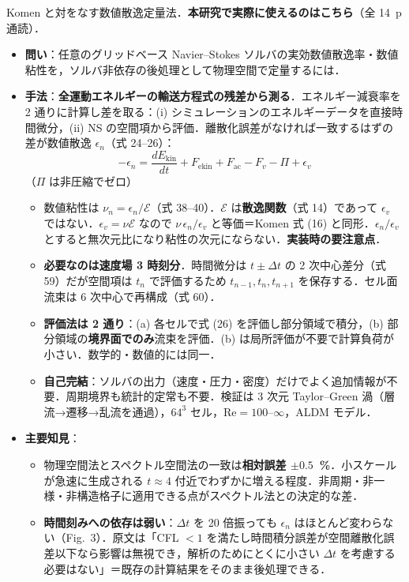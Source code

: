 \documentclass[11pt]{jsarticle}
\newcommand{\litref}[1]{{\large\bfseries\color{citecolor}#1}}
\begin{document}
\noindent\litref{Schranner et al. (2015)}\quad Komen と対をなす数値散逸定量法．\textbf{本研究で実際に使えるのはこちら}（全 14~p 通読）．
\begin{itemize}
  \item \textbf{問い}：任意のグリッドベース Navier--Stokes ソルバの実効数値散逸率・数値粘性を，ソルバ非依存の後処理として物理空間で定量するには．
  \item \textbf{手法}：\textbf{全運動エネルギーの輸送方程式の残差から測る}．エネルギー減衰率を 2 通りに計算し差を取る：(i) シミュレーションのエネルギーデータを直接時間微分，(ii) NS の空間項から評価．離散化誤差がなければ一致するはずの差が数値散逸 $\epsilon_n$（式 24--26）：
  \[ -\epsilon_n = \frac{dE_\mathrm{kin}}{dt} + F_\mathrm{ekin} + F_\mathrm{ac} - F_v - \Pi + \epsilon_v \]
  （$\Pi$ は非圧縮でゼロ）
  \begin{itemize}
    \item 数値粘性は $\nu_n = \epsilon_n/\mathcal{E}$（式 38--40）．$\mathcal{E}$ は\textbf{散逸関数}（式 14）であって $\epsilon_v$ ではない．$\epsilon_v = \nu\mathcal{E}$ なので $\nu\,\epsilon_n/\epsilon_v$ と等価＝Komen 式 (16) と同形．$\epsilon_n/\epsilon_v$ とすると無次元比になり粘性の次元にならない．\textbf{実装時の要注意点}．
    \item \textbf{必要なのは速度場 3 時刻分}．時間微分は $t \pm \Delta t$ の 2 次中心差分（式 59）だが空間項は $t_n$ で評価するため $t_{n-1}, t_n, t_{n+1}$ を保存する．セル面流束は 6 次中心で再構成（式 60）．
    \item \textbf{評価法は 2 通り}：(a) 各セルで式 (26) を評価し部分領域で積分，(b) 部分領域の\textbf{境界面でのみ}流束を評価．(b) は局所評価が不要で計算負荷が小さい．数学的・数値的には同一．
    \item \textbf{自己完結}：ソルバの出力（速度・圧力・密度）だけでよく追加情報が不要．周期境界も統計的定常も不要．検証は 3 次元 Taylor--Green 渦（層流→遷移→乱流を通過），$64^3$ セル，$\mathrm{Re} = 100$--$\infty$，ALDM モデル．
  \end{itemize}
  \item \textbf{主要知見}：
  \begin{itemize}
    \item 物理空間法とスペクトル空間法の一致は\textbf{相対誤差 $\pm 0.5$~\%}．小スケールが急速に生成される $t \approx 4$ 付近でわずかに増える程度．非周期・非一様・非構造格子に適用できる点がスペクトル法との決定的な差．
    \item \textbf{時間刻みへの依存は弱い}：$\Delta t$ を 20 倍振っても $\epsilon_n$ はほとんど変わらない（Fig.~3）．原文は「CFL $<1$ を満たし時間積分誤差が空間離散化誤差以下なら影響は無視でき，解析のためにとくに小さい $\Delta t$ を考慮する必要はない」＝既存の計算結果をそのまま後処理できる．

\end{itemize}
\end{itemize}
\end{document}
